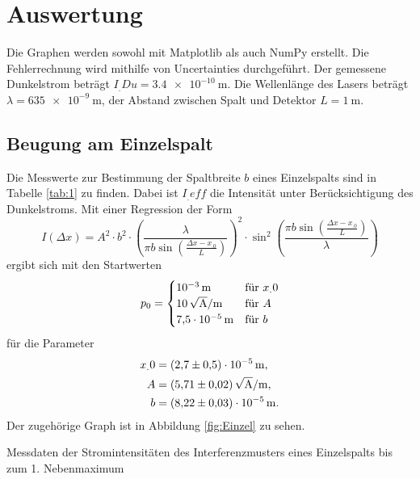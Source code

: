 \section{Auswertung}
\label{sec:Auswertung}


Die Graphen werden sowohl mit Matplotlib \cite{matplotlib} als auch NumPy \cite{numpy} erstellt. Die Fehlerrechnung wird mithilfe von Uncertainties \cite{uncertainties} 
durchgeführt.
\newline\newline
Der gemessene Dunkelstrom beträgt $I_.{Du}=\SI{3,4e-10}{\metre}$.
Die Wellenlänge des Lasers beträgt $\lambda = \SI{635e-9}{\metre}$, der Abstand zwischen Spalt und Detektor $L=\SI{1}{\metre}$.
\subsection{Beugung am Einzelspalt}

Die Messwerte zur Bestimmung der Spaltbreite $b$ eines Einzelspalts sind in Tabelle \ref{tab:1} zu finden. Dabei ist $I_.{eff}$ die Intensität unter Berücksichtigung des Dunkelstroms.
Mit einer Regression der Form 
\[
I(\Delta x)=A^2\cdot b^2\cdot\left(
\frac{\lambda}{\pi b \sin{\left(\frac{\Delta x-x_.0}{L}\right)}}\right)^2\cdot\sin^2{\left(\frac{\pi b\sin{\left(\frac{\Delta x-x_.0}{L}\right)}}{\lambda}\right)}
\]
ergibt sich mit den Startwerten
\begin{equation*}
p_0=
\begin{cases}
\SI{e-3}{\metre} 					& \text{für } x_.0\\
\SI{10}{\sqrt{\ampere}\per\metre}	& \text{für } A\\
\SI{7,5e-5}{\metre}					& \text{für } b\\
\end{cases}
\end{equation*}
für die Parameter
\begin{align*}
x_.0&= \SI{2,7(5)e-5}{\metre}\text{,} \\
A	&= \SI{5,71(2)}{\sqrt{\ampere}\per\metre}\text{,} \\
b   &= \SI{8,22(3)e-5}{\metre}\text{.} \\
\end{align*}
Der zugehörige Graph ist in Abbildung \ref{fig:Einzel} zu sehen.

\begin{table}
\caption{Messdaten der Stromintensitäten des Interferenzmusters eines Einzelspalts bis zum 1. Nebenmaximum}


\label{tab:1}
\end{table}


